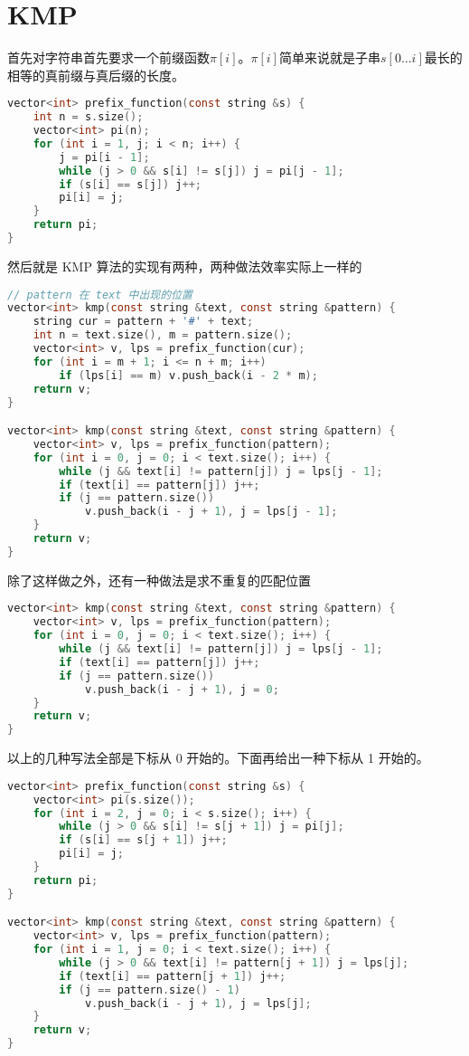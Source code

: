 \section{KMP}

首先对字符串首先要求一个前缀函数$\pi[i]$。$\pi[i]$简单来说就是子串$s[0\dots i]$最长的相等的真前缀与真后缀的长度。

\begin{lstlisting}[language = c]
vector<int> prefix_function(const string &s) {
    int n = s.size();
    vector<int> pi(n);
    for (int i = 1, j; i < n; i++) {
        j = pi[i - 1];
        while (j > 0 && s[i] != s[j]) j = pi[j - 1];
        if (s[i] == s[j]) j++;
        pi[i] = j;
    }
    return pi;
}
\end{lstlisting}

然后就是 KMP 算法的实现有两种，两种做法效率实际上一样的

\begin{lstlisting}[language = c]
// pattern 在 text 中出现的位置
vector<int> kmp(const string &text, const string &pattern) {
    string cur = pattern + '#' + text;
    int n = text.size(), m = pattern.size();
    vector<int> v, lps = prefix_function(cur);
    for (int i = m + 1; i <= n + m; i++)
        if (lps[i] == m) v.push_back(i - 2 * m);
    return v;
}

vector<int> kmp(const string &text, const string &pattern) {
    vector<int> v, lps = prefix_function(pattern);
    for (int i = 0, j = 0; i < text.size(); i++) {
        while (j && text[i] != pattern[j]) j = lps[j - 1];
        if (text[i] == pattern[j]) j++;
        if (j == pattern.size())
            v.push_back(i - j + 1), j = lps[j - 1];
    }
    return v;
}
\end{lstlisting}

除了这样做之外，还有一种做法是求不重复的匹配位置

\begin{lstlisting}[language = c]
vector<int> kmp(const string &text, const string &pattern) {
    vector<int> v, lps = prefix_function(pattern);
    for (int i = 0, j = 0; i < text.size(); i++) {
        while (j && text[i] != pattern[j]) j = lps[j - 1];
        if (text[i] == pattern[j]) j++;
        if (j == pattern.size())
            v.push_back(i - j + 1), j = 0;
    }
    return v;
}
\end{lstlisting}

以上的几种写法全部是下标从 0 开始的。下面再给出一种下标从 1 开始的。
\begin{lstlisting}[language = c]
vector<int> prefix_function(const string &s) {
    vector<int> pi(s.size());
    for (int i = 2, j = 0; i < s.size(); i++) {
        while (j > 0 && s[i] != s[j + 1]) j = pi[j];
        if (s[i] == s[j + 1]) j++;
        pi[i] = j;
    }
    return pi;
}

vector<int> kmp(const string &text, const string &pattern) {
    vector<int> v, lps = prefix_function(pattern);
    for (int i = 1, j = 0; i < text.size(); i++) {
        while (j > 0 && text[i] != pattern[j + 1]) j = lps[j];
        if (text[i] == pattern[j + 1]) j++;
        if (j == pattern.size() - 1)
            v.push_back(i - j + 1), j = lps[j];
    }
    return v;
}
\end{lstlisting}